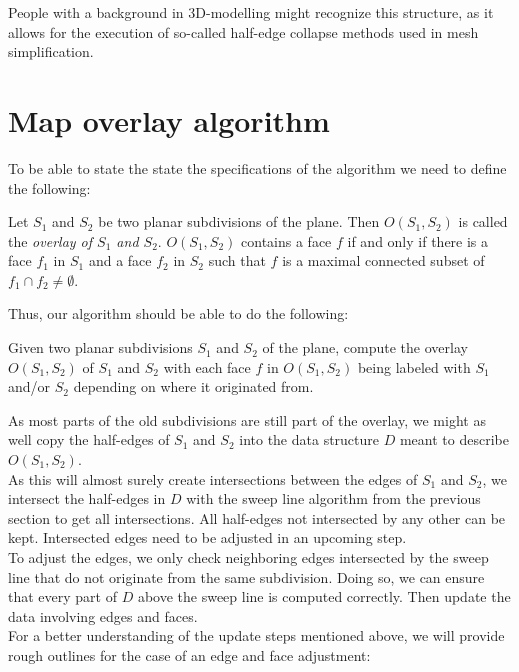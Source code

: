     \begin{remark}
        People with a background in 3D-modelling might recognize this structure, as it allows for the execution of so-called half-edge collapse methods used in mesh simplification.
    \end{remark}

\section{Map overlay algorithm}
    To be able to state the state the specifications of the algorithm we need to define the following:

    \begin{definition}
        Let $S_1$ and $S_2$ be two planar subdivisions of the plane. Then $O(S_1, S_2)$ is called the \emph{overlay of $S_1$ and $S_2$}. $O(S_1, S_2)$ contains a face $f$ if and only if there is a face $f_1$ in $S_1$ and a face $f_2$ in $S_2$ such that $f$ is a maximal connected subset of $f_1 \cap f_2 \neq \emptyset$.
    \end{definition}

    Thus, our algorithm should be able to do the following:
    \begin{mdframed}
        Given two planar subdivisions $S_1$ and $S_2$ of the plane, compute the overlay $O(S_1, S_2)$ of $S_1$ and $S_2$ with each face $f$ in $O(S_1, S_2)$ being labeled with $S_1$ and/or $S_2$ depending on where it originated from. 
    \end{mdframed}
    As most parts of the old subdivisions are still part of the overlay, we might as well copy the half-edges of $S_1$ and $S_2$ into the data structure $D$ meant to describe $O(S_1, S_2)$. \\
    As this will almost surely create intersections between the edges of $S_1$ and $S_2$, we intersect the half-edges in $D$ with the sweep line algorithm from the previous section to get all intersections. All half-edges not intersected by any other can be kept. Intersected edges need to be adjusted in an upcoming step. \\
    To adjust the edges, we only check neighboring edges intersected by the sweep line that do not originate from the same subdivision. Doing so, we can ensure that every part of $D$ above the sweep line is computed correctly. Then update the data involving edges and faces. \\
    For a better understanding of the update steps mentioned above, we will provide rough outlines for the case of an edge and face adjustment: \\

